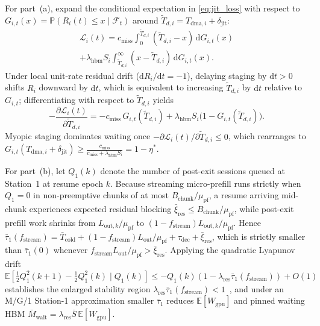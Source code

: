 \documentclass[10pt,journal,compsoc]{IEEEtran}
\theoremstyle{definition}
\theoremstyle{remark}
\newcommand{\E}{\mathbb{E}}
\newcommand{\Prob}{\mathbb{P}}
\begin{document}
\begin{IEEEproof}
For part~(a), expand the conditional expectation in \eqref{eq:jit_loss} with respect to $G_{i,t}(x) = \Prob(R_i(t) \le x \mid \mathcal{F}_t)$ around $\tilde{T}_{d,i} = T_{\mathrm{dma},i} + \delta_{\mathrm{jit}}$:
\begin{multline*}
\mathcal{L}_i(t) = c_{\mathrm{miss}} \int_0^{\tilde{T}_{d,i}} (\tilde{T}_{d,i} - x)\,\mathrm{d}G_{i,t}(x) \\
+ \lambda_{\mathrm{hbm}} S_i \int_{\tilde{T}_{d,i}}^\infty (x - \tilde{T}_{d,i})\,\mathrm{d}G_{i,t}(x).
\end{multline*}
Under local unit-rate residual drift ($\mathrm{d}R_i/\mathrm{d}t = -1$), delaying staging by $\mathrm{d}t > 0$ shifts $R_i$ downward by $\mathrm{d}t$, which is equivalent to increasing $\tilde{T}_{d,i}$ by $\mathrm{d}t$ relative to $G_{i,t}$; differentiating with respect to $\tilde{T}_{d,i}$ yields
\begin{equation*}
-\frac{\partial \mathcal{L}_i(t)}{\partial \tilde{T}_{d,i}} = -c_{\mathrm{miss}}\,G_{i,t}(\tilde{T}_{d,i}) + \lambda_{\mathrm{hbm}} S_i\bigl(1 - G_{i,t}(\tilde{T}_{d,i})\bigr).
\end{equation*}
Myopic staging dominates waiting once $-\partial \mathcal{L}_i(t)/\partial \tilde{T}_{d,i} \le 0$, which rearranges to $G_{i,t}(T_{\mathrm{dma},i} + \delta_{\mathrm{jit}}) \ge \frac{c_{\mathrm{miss}}}{c_{\mathrm{miss}} + \lambda_{\mathrm{hbm}} S_i} = 1 - \eta^*$.

For part~(b), let $Q_1(k)$ denote the number of post-exit sessions queued at Station~1 at resume epoch $k$. Because streaming micro-prefill runs strictly when $Q_1 = 0$ in non-preemptive chunks of at most $B_{\mathrm{chunk}}/\mu_{\mathrm{pf}}$, a resume arriving mid-chunk experiences expected residual blocking $\bar{\xi}_{\mathrm{res}} \le B_{\mathrm{chunk}}/\mu_{\mathrm{pf}}$, while post-exit prefill work shrinks from $L_{\mathrm{out},k}/\mu_{\mathrm{pf}}$ to $(1 - f_{\mathrm{stream}})L_{\mathrm{out},k}/\mu_{\mathrm{pf}}$. Hence $\bar{\tau}_1(f_{\mathrm{stream}}) = \bar{T}_{\mathrm{cold}} + (1 - f_{\mathrm{stream}})L_{\mathrm{out}}/\mu_{\mathrm{pf}} + \tau_{\mathrm{dec}} + \bar{\xi}_{\mathrm{res}}$, which is strictly smaller than $\bar{\tau}_1(0)$ whenever $f_{\mathrm{stream}} L_{\mathrm{out}}/\mu_{\mathrm{pf}} > \bar{\xi}_{\mathrm{res}}$. Applying the quadratic Lyapunov drift $\E[\frac{1}{2}Q_1^2(k+1) - \frac{1}{2}Q_1^2(k) \mid Q_1(k)] \le -Q_1(k)(1 - \lambda_{\mathrm{res}}\bar{\tau}_1(f_{\mathrm{stream}})) + O(1)$ establishes the enlarged stability region $\lambda_{\mathrm{res}}\bar{\tau}_1(f_{\mathrm{stream}}) < 1$~\cite{neely2010stochastic}, and under an M/G/1 Station-1 approximation smaller $\bar{\tau}_1$ reduces $\E[W_{\mathrm{gpu}}]$ and pinned waiting HBM $\bar{M}_{\mathrm{wait}} = \lambda_{\mathrm{res}}\bar{S}\,\E[W_{\mathrm{gpu}}]$.
\end{IEEEproof}



\end{document}
